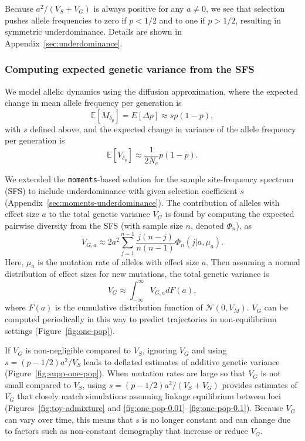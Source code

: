 \documentclass{article}
\newcommand{\E}{\mathbb{E}}
\newcommand{\moments}{\texttt{moments}\xspace}
\begin{document}
Because $a^2/(V_S+V_G)$ is always positive for any $a\not=0$, we see that
selection pushes allele frequencies to zero if $p<1/2$ and to one if $p>1/2$,
resulting in symmetric underdominance. Details are shown in
Appendix~\ref{sec:underdominance}.

\subsubsection*{Computing expected genetic variance from the SFS}

We model allelic dynamics using the diffusion approximation, where the expected
change in mean allele frequency per generation is
\[\E[M_{\delta_p}] = E[\Delta p] \approx s p(1-p),\]
with $s$ defined above, and the expected change in variance of the allele frequency per
generation is
\[\E[V_{\delta_p}] \approx \frac{1}{2N_e}p(1-p).\]


We extended the \moments-based solution for the sample site-frequency spectrum
(SFS) \citep{jouganous2017inferring} to include underdominance with given
selection coefficient $s$ (Appendix~\ref{sec:moments-underdominance}). The
contribution of alleles with effect size $a$ to the total genetic variance
$V_G$ is found by computing the expected pairwise diversity from the SFS (with
sample size $n$, denoted $\Phi_n$), as
\[V_{G,a} \approx 2a^2\sum_{j=1}^{n-1} \frac{j(n-j)}{n(n-1)} \Phi_n(j|a,\mu_a).\]
Here, $\mu_a$ is the mutation rate of alleles with effect size $a$. Then
assuming a normal distribution of effect sizes for new mutations, the total
genetic variance is
\[V_G \approx \int_{-\infty}^\infty V_{G,a} dF(a),\]
where \(F(a)\) is the cumulative distribution function of \(\mathcal{N}(0,V_M)\).
$V_G$ can be computed periodically in this way to predict trajectories in
non-equilibrium settings (Figure~\ref{fig:one-pop}).

If $V_G$ is non-negligible compared to $V_S$, ignoring $V_G$ and using
$s=(p-1/2)a^2/V_S$ leads to deflated estimates of additive genetic variance
(Figure~\ref{fig:supp-one-pop}). When mutation rates are large so that $V_G$ is
not small compared to $V_S$, using $s=(p-1/2)a^2/(V_S+V_G)$ provides estimates
of $V_G$ that closely match simulations assuming linkage equilibrium between
loci (Figures~\ref{fig:toy-admixture} and
\ref{fig:one-pop-0.01}--\ref{fig:one-pop-0.1}). Because $V_G$ can vary over
time, this means that $s$ is no longer constant and can change due to factors
such as non-constant demography that increase or reduce $V_G$.
\end{document}
